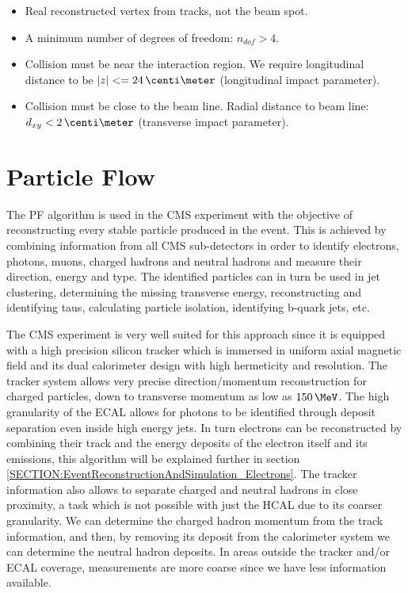 \begin{itemize}
  \item Real reconstructed vertex from tracks, not the beam spot.
  \item A minimum number of degrees of freedom: $n_{dof}>4$.
  \item Collision must be near the interaction region. We require longitudinal distance to be $|z|<=24\,\centi\meter$ (longitudinal impact parameter).
  \item Collision must be close to the beam line. Radial distance to beam line: $d_{xy}<2\,\centi\meter$ (transverse impact parameter). 
\end{itemize}

\section{Particle Flow}
\label{SECTION:EventReconstructionAndSimulation_ParticleFlow}


The \gls{PF} algorithm \cite{ARTICLE:CMSComissioningOfParticleFlow, ARTICLE:CMSParticleFlowEventRecontruction, ARTICLE:CMSComissioningOfParticleFlowWithMinBias} is used in the \gls{CMS} experiment with the objective of reconstructing every stable particle produced in the event. This is achieved by combining information from all \gls{CMS} sub-detectors in order to identify electrons, photons, muons, charged hadrons and neutral hadrons and measure their direction, energy and type. The identified particles can in turn be used in jet clustering, determining the missing transverse energy, reconstructing and identifying taus, calculating particle isolation, identifying b-quark jets, etc.

The \gls{CMS} experiment is very well suited for this approach since it is equipped with a high precision silicon tracker which is immersed in uniform axial magnetic field and its dual calorimeter design with high hermeticity and resolution. The tracker system allows very precise direction/momentum reconstruction for charged particles, down to transverse momentum as low as $150\,\MeV$. The high granularity of the \gls{ECAL} allows for photons to be identified through deposit separation even inside high energy jets. In turn electrons can be reconstructed by combining their track and the energy deposits of the electron itself and its emissions, this algorithm will be explained further in section \ref{SECTION:EventReconstructionAndSimulation_Electrons}. The tracker information also allows to separate charged and neutral hadrons in close proximity, a task which is not possible with just the \gls{HCAL} due to its coarser granularity. We can determine the charged hadron momentum from the track information, and then, by removing its deposit from the calorimeter system we can determine the neutral hadron deposits. In areas outside the tracker and/or \gls{ECAL} coverage, measurements are more coarse since we have less information available.

